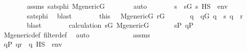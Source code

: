 \begin{isabellebody}
\ \ \ \ \ \ \isamarkupfalse%
\ assms\ satsphi\ {\isacartoucheopen}M{\isacharunderscore}{\kern0pt}generic{\isacharparenleft}{\kern0pt}G{\isacharparenright}{\kern0pt}{\isacartoucheclose}\isanewline
\ \ \ \ \ \ \isamarkupfalse%
\ auto\isanewline
\ \ \ \ \isamarkupfalse%
\ \isamarkupfalse%
\ s\ \ {\isachardoublequoteopen}s{\isasymin}G{\isachardoublequoteclose}\ {\isachardoublequoteopen}{\isacharparenleft}{\kern0pt}s\ {\isasymtturnstile}HS\ {\isasymphi}\ env{\isacharparenright}{\kern0pt}{\isachardoublequoteclose}\isanewline
\ \ \ \ \ \ \isamarkupfalse%
\ satsphi\ \isamarkupfalse%
\ blast\isanewline
\ \ \ \ \isamarkupfalse%
\ \isamarkupfalse%
\ this\ \ \ {\isacartoucheopen}M{\isacharunderscore}{\kern0pt}generic{\isacharparenleft}{\kern0pt}G{\isacharparenright}{\kern0pt}{\isacartoucheclose}\ {\isacartoucheopen}r{\isasymin}G{\isacartoucheclose}\ \isanewline
\ \ \ \ \isamarkupfalse%
\ q\ \ {\isachardoublequoteopen}q{\isasymin}G{\isachardoublequoteclose}\ {\isachardoublequoteopen}q\ {\isasympreceq}\ s{\isachardoublequoteclose}\ {\isachardoublequoteopen}q\ {\isasympreceq}\ r{\isachardoublequoteclose}\isanewline
\ \ \ \ \ \ \isamarkupfalse%
\ blast\isanewline
\ \ \ \ \isamarkupfalse%
\ \isamarkupfalse%
\ calculation\ {\isacartoucheopen}s{\isasymin}G{\isacartoucheclose}\ {\isacartoucheopen}M{\isacharunderscore}{\kern0pt}generic{\isacharparenleft}{\kern0pt}G{\isacharparenright}{\kern0pt}{\isacartoucheclose}\ \isanewline
\ \ \ \ \isamarkupfalse%
\ {\isachardoublequoteopen}s{\isasymin}P{\isachardoublequoteclose}\ {\isachardoublequoteopen}q{\isasymin}P{\isachardoublequoteclose}\ \isanewline
\ \ \ \ \ \ \isamarkupfalse%
\ M{\isacharunderscore}{\kern0pt}generic{\isacharunderscore}{\kern0pt}def\ filter{\isacharunderscore}{\kern0pt}def\ \isamarkupfalse%
\ auto\isanewline
\ \ \ \ \isamarkupfalse%
\ \isanewline
\ \ \ \ \isamarkupfalse%
\ assms\isanewline
\ \ \ \ \isamarkupfalse%
\ \isanewline
\ \ \ \ \isamarkupfalse%
\ {\isachardoublequoteopen}{\isasymexists}q{\isasymin}P{\isachardot}{\kern0pt}\ q{\isasympreceq}r\ {\isasymand}\ {\isacharparenleft}{\kern0pt}q\ {\isasymtturnstile}HS\ {\isasymphi}\ env{\isacharparenright}{\kern0pt}{\isachardoublequoteclose}\isanewline
\ \ \ \ \ \ \isamarkupfalse%

\end{isabellebody}
